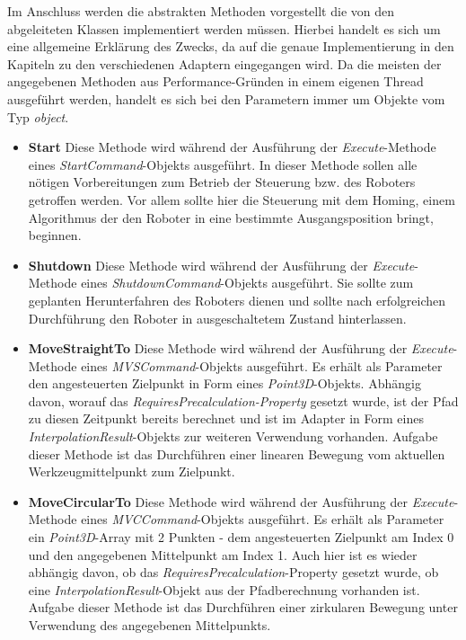 Im Anschluss werden die abstrakten Methoden vorgestellt die von den abgeleiteten Klassen implementiert werden müssen. Hierbei handelt es sich um eine allgemeine Erklärung des Zwecks, da auf die genaue Implementierung in den Kapiteln zu den verschiedenen Adaptern eingegangen wird. Da die meisten der angegebenen Methoden aus Performance-Gründen in einem eigenen Thread ausgeführt werden, handelt es sich bei den Parametern immer um Objekte vom Typ \textit{object}. 
\begin{itemize}
\item \textbf{Start}
\newline
Diese Methode wird während der Ausführung der \textit{Execute}-Methode eines \textit{StartCommand}-Objekts ausgeführt. In dieser Methode sollen alle nötigen Vorbereitungen zum Betrieb der Steuerung bzw. des Roboters getroffen werden. Vor allem sollte hier die Steuerung mit dem Homing, einem Algorithmus der den Roboter in eine bestimmte Ausgangsposition bringt, beginnen.
\item \textbf{Shutdown}
\newline
Diese Methode wird während der Ausführung der \textit{Execute}-Methode eines \textit{ShutdownCommand}-Objekts ausgeführt. Sie sollte zum geplanten Herunterfahren des Roboters dienen und sollte nach erfolgreichen Durchführung den Roboter in ausgeschaltetem Zustand hinterlassen.
\item \textbf{MoveStraightTo}
\newline
Diese Methode wird während der Ausführung der \textit{Execute}-Methode eines \textit{MVSCommand}-Objekts ausgeführt. Es erhält als Parameter den angesteuerten Zielpunkt in Form eines \textit{Point3D}-Objekts. Abhängig davon, worauf das \textit{RequiresPrecalculation-Property} gesetzt wurde, ist der Pfad zu diesen Zeitpunkt bereits berechnet und ist im Adapter in Form eines \textit{InterpolationResult}-Objekts zur weiteren Verwendung vorhanden. Aufgabe dieser Methode ist das Durchführen einer linearen Bewegung vom aktuellen Werkzeugmittelpunkt zum Zielpunkt.
\item \textbf{MoveCircularTo}
\newline
Diese Methode wird während der Ausführung der \textit{Execute}-Methode eines \textit{MVCCommand}-Objekts ausgeführt. Es erhält als Parameter ein \textit{Point3D}-Array mit 2 Punkten - dem angesteuerten Zielpunkt am Index 0 und den angegebenen Mittelpunkt am Index 1. Auch hier ist es wieder abhängig davon, ob das \textit{RequiresPrecalculation}-Property gesetzt wurde, ob eine \textit{InterpolationResult}-Objekt aus der Pfadberechnung vorhanden ist. Aufgabe dieser Methode ist das Durchführen einer zirkularen Bewegung unter Verwendung des angegebenen Mittelpunkts.

\end{itemize}

